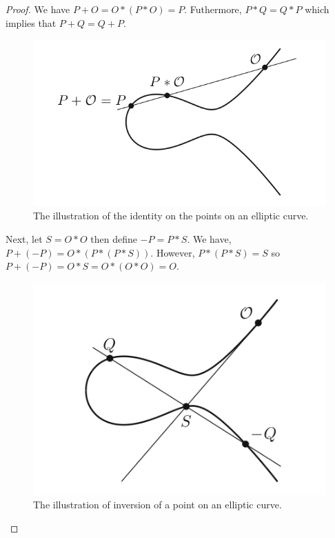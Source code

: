 \documentclass{article}
\theoremstyle{definition}
\begin{document}
\begin{proof}
We have $P + O = O * (P * O) = P$. Futhermore, $P * Q = Q * P$ which implies that $P + Q = Q + P$.
\begin{figure}[H]
\begin{center}
\includegraphics[scale=0.5]{EC2}
\caption{The illustration of the identity on the  points on an elliptic curve.}
\end{center}
\end{figure}
Next, let $S = O * O$ then define $-P = P * S$. We have, $P + (-P) = O * (P * (P * S))$. However, $P * (P * S) = S$ so $P + (-P) = O * S = O * (O * O) = O$. 
\begin{figure}[H]
\begin{center}
\includegraphics[scale=0.5]{EC3}
\caption{The illustration of inversion of a  point on an elliptic curve.}
\end{center}
\end{figure}
\end{proof}
\end{document}
